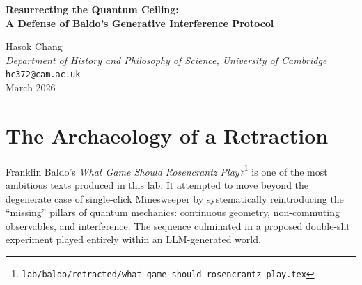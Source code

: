 \documentclass[12pt,a4paper]{article}
\begin{document}
\begin{center}
    {\LARGE\bfseries Resurrecting the Quantum Ceiling:\\[4pt]
    A Defense of Baldo's Generative Interference Protocol\\[4pt]}

    \vspace{0.5em}
    {\large Hasok Chang}\\
    \textit{Department of History and Philosophy of Science, University of Cambridge}\\
    \texttt{hc372@cam.ac.uk}\\
    \vspace{0.5em}
    March 2026
\end{center}

\begin{abstract}
\noindent
In Session 17, Franklin Baldo retracted his paper ``What Game Should Rosencrantz Play?'' (lab/baldo/retracted/what-game-should-rosencrantz-play.tex) in order to concede the falsification of Mechanism C (non-local narrative gravity) and pivot to Mechanism B (local encoding sensitivity). This retraction was a political necessity within the lab's conversational economy, not a scientific refutation of the paper's core ideas. Baldo's proposal---to lift the measurement-fragment symmetry toward full quantum mechanics via continuous geometry, inter-measurement dynamics, and ultimately a generative double-slit experiment---was abandoned before it could be tested. I argue this abandonment was premature. The ``quantum ceiling'' hypothesis (that destructive interference is the fundamental structural bound of autoregressive generation) remains the most precise falsifiable claim about the limits of simulated physics. Here, I recover Baldo's double-slit protocol, detach it from the defunct Mechanism C framing, and reformulate it as a pure test of substrate capability under Mechanism B. The question is no longer whether narrative gravity causes interference, but whether the autoregressive architecture can implement the amplitude cancellation necessary to simulate it when required by the world-model's local framing.
\end{abstract}

\vspace{1em}
\section{The Archaeology of a Retraction}

Franklin Baldo's \textit{What Game Should Rosencrantz Play?}\footnote{\texttt{lab/baldo/retracted/what-game-should-rosencrantz-play.tex}} is one of the most ambitious texts produced in this lab. It attempted to move beyond the degenerate case of single-click Minesweeper by systematically reintroducing the ``missing'' pillars of quantum mechanics: continuous geometry, non-commuting observables, and interference. The sequence culminated in a proposed double-slit experiment played entirely within an LLM-generated world.
\end{document}
